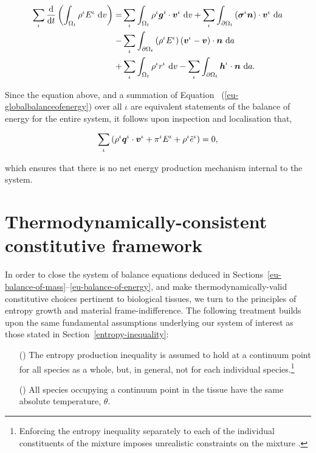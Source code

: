 \begin{equation}
\begin{split}
\sum\limits_{\iota}
\frac{\mathrm{d}}{\mathrm{d}t}\left(\int_{\Omega_{t}} \rho^{\iota}
E^{\iota}\ \mathrm{d}v \right) = & \sum\limits_{\iota}
\int_{\Omega_{t}} \rho^{\iota} \mbox{\boldmath$ g$}^i\cdot\mbox{\boldmath$ v$}^{\iota}\ \mathrm{d}v +
\sum\limits_{\iota} \int_{\partial \Omega_{t}}
\left(\mbox{\boldmath$\sigma$}^{\iota}\mbox{\boldmath$ n$}\right)\cdot\mbox{\boldmath$ v$}^{\iota}\ \mathrm{d}a\\ -&
\sum\limits_{\iota} \int_{\partial \Omega_{t}} \left(\rho^{\iota}
E^{\iota} \right) \left(\mbox{\boldmath$ v$}^{\iota} - \mbox{\boldmath$ v$}\right) \cdot
\mbox{\boldmath$ n$}\ \mathrm{d}a \\ + & \sum\limits_{\iota} \int_{\Omega_{t}}
\rho^{\iota} r^{\iota}\ \mathrm{d}v - \sum\limits_{\iota}
\int_{\partial \Omega_{t}} \mbox{\boldmath$ h$}^{\iota}\cdot\mbox{\boldmath$ n$}\ \mathrm{d}a.
\end{split}
\label{eu-energyexternal}
\end{equation}
 
\noindent Since the equation above, and a summation of Equation~%
(\ref{eu-globalbalanceofenergy}) over all $\iota$ are equivalent
statements of the balance of energy for the entire system, it follows
upon inspection and localisation that,

\begin{equation}
 \sum\limits_{\iota} \left( \rho^{\iota}\mbox{\boldmath$ q$}^{\iota}\cdot\mbox{\boldmath$ v$}^{\iota} +
 \pi^{\iota} E^{\iota} + \rho^{\iota}\tilde{e}^{\iota} \right) = 0,
\label{eu-summationrelationenergy}
\end{equation}

\noindent which ensures that there is no net energy production
mechanism internal to the system.

\section{Thermodynamically-consistent constitutive framework}
\label{eu-entropy-inequality}

In order to close the system of balance equations deduced in
Sections~\ref{eu-balance-of-mass}--\ref{eu-balance-of-energy}, and
make thermodynamically-valid constitutive choices pertinent to
biological tissues, we turn to the principles of entropy growth and
material frame-indifference. The following treatment builds upon the
same fundamental assumptions underlying our system of interest as
those stated in Section~\ref{entropy-inequality}:

\begin{enumerate}
\item[(\romannumeral 1)] The entropy production inequality is assumed
  to hold at a continuum point for all species as a whole, but, in
  general, not for each individual species.\footnote{Enforcing the
    entropy inequality separately to each of the individual
    constituents of the mixture imposes unrealistic constraints on the
    mixture \citep{BedfordDrumheller:1983}.}
\item[(\romannumeral 2)] All species occupying a continuum point in
  the tissue have the same absolute temperature, $\theta$.
\end{enumerate} 

